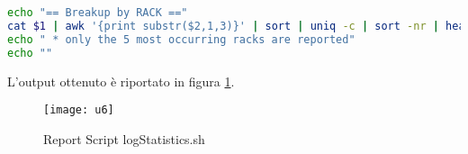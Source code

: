 \begin{lstlisting}[language=bash]
echo "== Breakup by RACK =="
cat $1 | awk '{print substr($2,1,3)}' | sort | uniq -c | sort -nr | head -n 5 | awk '{print $2, $1}'
echo " * only the 5 most occurring racks are reported"
echo ""
\end{lstlisting}

L'output ottenuto è riportato in figura \ref{ffda_u6}.\\

\begin{figure}[!htbp]
  \centering
  \texttt{[image: u6]}
  \caption{Report Script logStatistics.sh}
  \label{ffda_u6}
\end{figure}
